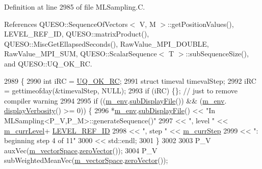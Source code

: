 Definition at line 2985 of file M\-L\-Sampling.\-C.



References Q\-U\-E\-S\-O\-::\-Sequence\-Of\-Vectors$<$ V, M $>$\-::get\-Position\-Values(), L\-E\-V\-E\-L\-\_\-\-R\-E\-F\-\_\-\-I\-D, Q\-U\-E\-S\-O\-::matrix\-Product(), Q\-U\-E\-S\-O\-::\-Misc\-Get\-Ellapsed\-Seconds(), Raw\-Value\-\_\-\-M\-P\-I\-\_\-\-D\-O\-U\-B\-L\-E, Raw\-Value\-\_\-\-M\-P\-I\-\_\-\-S\-U\-M, Q\-U\-E\-S\-O\-::\-Scalar\-Sequence$<$ T $>$\-::sub\-Sequence\-Size(), and Q\-U\-E\-S\-O\-::\-U\-Q\-\_\-\-O\-K\-\_\-\-R\-C.


\begin{DoxyCode}
2989 \{
2990   \textcolor{keywordtype}{int} iRC = \hyperlink{namespace_q_u_e_s_o_a8e909502900aecf24cedba022ea84471}{UQ\_OK\_RC};
2991   \textcolor{keyword}{struct }timeval timevalStep;
2992   iRC = gettimeofday(&timevalStep, NULL);
2993   \textcolor{keywordflow}{if} (iRC) \{\}; \textcolor{comment}{// just to remove compiler warning}
2994 
2995       \textcolor{keywordflow}{if} ((\hyperlink{class_q_u_e_s_o_1_1_m_l_sampling_a13f1ca4fe9f94822fe572a743eaced1d}{m\_env}.\hyperlink{class_q_u_e_s_o_1_1_base_environment_a8a0064746ae8dddfece4229b9ad374d6}{subDisplayFile}()) && (\hyperlink{class_q_u_e_s_o_1_1_m_l_sampling_a13f1ca4fe9f94822fe572a743eaced1d}{m\_env}.
      \hyperlink{class_q_u_e_s_o_1_1_base_environment_a1fe5f244fc0316a0ab3e37463f108b96}{displayVerbosity}() >= 0)) \{
2996         *\hyperlink{class_q_u_e_s_o_1_1_m_l_sampling_a13f1ca4fe9f94822fe572a743eaced1d}{m\_env}.\hyperlink{class_q_u_e_s_o_1_1_base_environment_a8a0064746ae8dddfece4229b9ad374d6}{subDisplayFile}() << \textcolor{stringliteral}{"In MLSampling<P\_V,P\_M>::generateSequence()"}
2997                                 << \textcolor{stringliteral}{", level "} << \hyperlink{class_q_u_e_s_o_1_1_m_l_sampling_af9416874c856e50f3b35270e801f17e4}{m\_currLevel}+
      \hyperlink{_m_l_sampling_level_options_8h_a68d15eaf394d210effcf584b938206d3}{LEVEL\_REF\_ID}
2998                                 << \textcolor{stringliteral}{", step "}  << \hyperlink{class_q_u_e_s_o_1_1_m_l_sampling_a1b1f8ccb4823bdfa26ec652f0807c63e}{m\_currStep}
2999                                 << \textcolor{stringliteral}{": beginning step 4 of 11"}
3000                                 << std::endl;
3001       \}
3002 
3003       P\_V auxVec(\hyperlink{class_q_u_e_s_o_1_1_m_l_sampling_a7bc4c72f65ba9166ed94a6e198b0915b}{m\_vectorSpace}.\hyperlink{class_q_u_e_s_o_1_1_vector_space_a92e963bb5cab3eecd290dfe4b8f03b04}{zeroVector}());
3004       P\_V subWeightedMeanVec(\hyperlink{class_q_u_e_s_o_1_1_m_l_sampling_a7bc4c72f65ba9166ed94a6e198b0915b}{m\_vectorSpace}.\hyperlink{class_q_u_e_s_o_1_1_vector_space_a92e963bb5cab3eecd290dfe4b8f03b04}{zeroVector}());

\end{DoxyCode}
